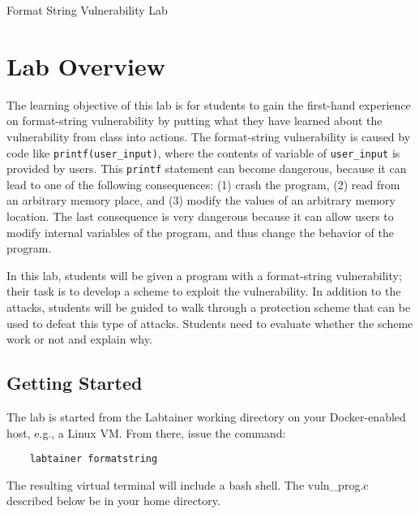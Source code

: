 







\begin{center}
{\LARGE Format String Vulnerability Lab}
\end{center}

\copyrightnotice


\section{Lab Overview}

The learning objective of this lab is for students to gain the first-hand
experience on format-string vulnerability by putting what they have learned 
about the vulnerability from class into actions.
The format-string vulnerability is caused by code like 
{\tt printf(user\_input)}, where the contents of variable
of {\tt user\_input} is provided by users. 
This {\tt printf}
statement can become dangerous, because it can lead to one of the following
consequences: (1) crash the 
program, (2) read from an arbitrary memory place, and (3) modify
the values of an arbitrary memory location. The last consequence
is very dangerous because it can allow users to modify internal
variables of the program, and thus change the behavior
of the program.  


In this lab, students will be given a program with a format-string
vulnerability; their task is to develop a scheme to exploit
the vulnerability.  In addition to the
attacks, students will be guided to walk through a protection
scheme that can be used to defeat this type of attacks. 
Students need to evaluate
whether the scheme work or not and explain why.


\subsection{Getting Started}
The lab is started from the Labtainer working 
directory on your Docker-enabled host, e.g., a Linux VM.
From there, issue the command:
\begin{verbatim}
    labtainer formatstring
\end{verbatim}

The resulting virtual terminal will include 
a bash shell.  The vuln\_prog.c 
described below be in your home directory.


